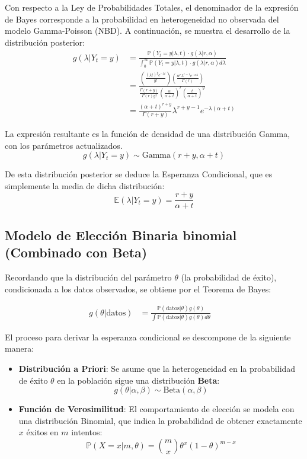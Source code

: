 \documentclass[
]{book}
\begin{document}
Con respecto a la Ley de Probabilidades Totales, el denominador de la
expresión de Bayes corresponde a la probabilidad en heterogeneidad no
observada del modelo Gamma-Poisson (NBD). A continuación, se muestra el
desarrollo de la distribución posterior: \[
\begin{aligned}
g(\lambda|Y_t=y) &= \frac{\mathbb{P}(Y_t=y|\lambda, t) \cdot g(\lambda|r, \alpha)}{\int_0^\infty \mathbb{P}(Y_t=y|\lambda, t) \cdot g(\lambda|r, \alpha) d\lambda} \\
&= \frac{ \left( \frac{(\lambda t)^y e^{-\lambda t}}{y!} \right) \left( \frac{\alpha^r \lambda^{r-1} e^{-\alpha\lambda}}{\Gamma(r)} \right) }{ \frac{\Gamma(r+y)}{\Gamma(r)y!} \left(\frac{\alpha}{\alpha+t}\right)^r \left(\frac{t}{\alpha+t}\right)^{y} } \\
&= \frac{(\alpha+t)^{r+y}}{\Gamma(r+y)}\lambda^{r+y-1}e^{-\lambda(\alpha+t)}
\end{aligned}
\]

La expresión resultante es la función de densidad de una distribución
Gamma, con los parámetros actualizados.
\[g(\lambda|Y_t=y) \sim \text{Gamma}(r+y, \alpha+t)\]

De esta distribución posterior se deduce la Esperanza Condicional, que
es simplemente la media de dicha distribución:
\[ \mathbb{E}(\lambda|Y_t=y) = \frac{r+y}{\alpha+t} \]

\subsection{Modelo de Elección Binaria binomial (Combinado con Beta)}\label{modelo-de-elecciuxf3n-binaria-binomial-combinado-con-beta}

Recordando que la distribución del parámetro \(\theta\) (la probabilidad
de éxito), condicionada a los datos observados, se obtiene por el
Teorema de Bayes:

\[
\begin{aligned}
g(\theta|\text{datos}) &= \frac{\mathbb{P}(\text{datos}|\theta)g(\theta)}{\int \mathbb{P}(\text{datos}|\theta)g(\theta)d\theta}
\end{aligned}
\quad \label{eq:thetabayes} \]

El proceso para derivar la esperanza condicional se descompone de la
siguiente manera:

\begin{itemize}
\item
  \textbf{Distribución a Priori}: Se asume que la heterogeneidad en la
  probabilidad de éxito \(\theta\) en la población sigue una
  distribución \textbf{Beta}:
  \[ g(\theta|\alpha, \beta) \sim \text{Beta}(\alpha, \beta) \]
\item
  \textbf{Función de Verosimilitud}: El comportamiento de elección se
  modela con una distribución Binomial, que indica la probabilidad de
  obtener exactamente \(x\) éxitos en \(m\) intentos:
  \[ \mathbb{P}(X=x|m, \theta) = \binom{m}{x} \theta^x (1-\theta)^{m-x} \]
\end{itemize}
\end{document}
